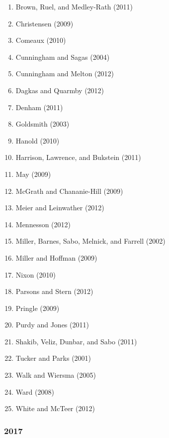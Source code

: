 \documentclass[english,man]{apa6}
\providecommand{\tightlist}{%
  \setlength{\itemsep}{0pt}\setlength{\parskip}{0pt}}
\theoremstyle{definition}
\theoremstyle{definition}
\theoremstyle{definition}
\theoremstyle{remark}
\begin{document}
\begin{enumerate}
\def\labelenumi{\arabic{enumi})}
\tightlist
\item
  Brown, Ruel, and Medley-Rath (2011)
\item
  Christensen (2009)
\item
  Comeaux (2010)
\item
  Cunningham and Sagas (2004)
\item
  Cunningham and Melton (2012)
\item
  Dagkas and Quarmby (2012)
\item
  Denham (2011)
\item
  Goldsmith (2003)
\item
  Hanold (2010)
\item
  Harrison, Lawrence, and Bukstein (2011)
\item
  May (2009)
\item
  McGrath and Chananie-Hill (2009)
\item
  Meier and Leinwather (2012)
\item
  Mennesson (2012)
\item
  Miller, Barnes, Sabo, Melnick, and Farrell (2002)
\item
  Miller and Hoffman (2009)
\item
  Nixon (2010)
\item
  Parsons and Stern (2012)
\item
  Pringle (2009)
\item
  Purdy and Jones (2011)
\item
  Shakib, Veliz, Dunbar, and Sabo (2011)
\item
  Tucker and Parks (2001)
\item
  Walk and Wiersma (2005)
\item
  Ward (2008)
\item
  White and McTeer (2012)
\end{enumerate}

\subsubsection{2017}\label{section-53}
\end{document}
